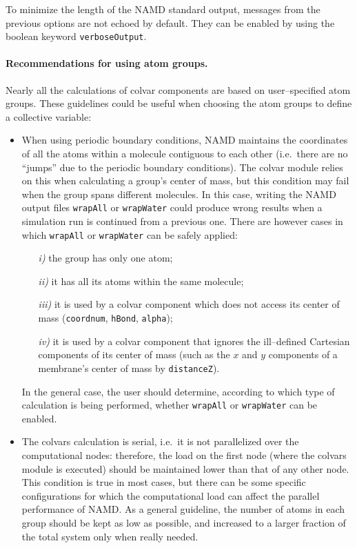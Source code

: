 To minimize the length of the NAMD standard output, messages from the
previous options are not echoed by default.  They can be enabled by
using the boolean keyword \texttt{verboseOutput}.


\paragraph*{Recommendations for using atom groups.}  Nearly all the
calculations of colvar components are based on user--specified atom
groups.  These guidelines could be useful when choosing the atom
groups to define a collective variable:

\begin{itemize}

\item When using periodic boundary conditions, NAMD maintains the
  coordinates of all the atoms within a molecule contiguous to each
  other (i.e.~there are no ``jumps'' due to the periodic boundary
  conditions).  The colvar module relies on this when calculating a
  group's center of mass, but this condition may fail when the group
  spans different molecules.  In this case, writing the NAMD output
  files \texttt{wrapAll} or \texttt{wrapWater} could produce wrong
  results when a simulation run is continued from a previous one.
  There are however cases in which \texttt{wrapAll} or
  \texttt{wrapWater} can be safely applied:
  \begin{enumerate}
  \item[\emph{i)}] the group has only one atom;
  \item[\emph{ii)}] it has all its atoms within the same molecule;
  \item[\emph{iii)}] it is used by a colvar component which does
    not access its center of mass (\texttt{coordnum},
    \texttt{hBond}, \texttt{alpha});
  \item[\emph{iv)}] it is used by a colvar component that ignores the
    ill--defined Cartesian components of its center of mass (such as
    the $x$ and $y$ components of a membrane's center of mass by
    \texttt{distanceZ}).
  \end{enumerate}    
  In the general case, the user should determine, according to which
  type of calculation is being performed, whether \texttt{wrapAll} or
  \texttt{wrapWater} can be enabled.

\item The colvars calculation is serial, i.e.~it is not parallelized
  over the computational nodes: therefore, the load on the first node
  (where the colvars module is executed) should be maintained lower
  than that of any other node.  This condition is true in most cases,
  but there can be some specific configurations for which the
  computational load can affect the parallel performance of NAMD.  As
  a general guideline, the number of atoms in each group should be
  kept as low as possible, and increased to a larger fraction of the
  total system only when really needed.


\end{itemize}
